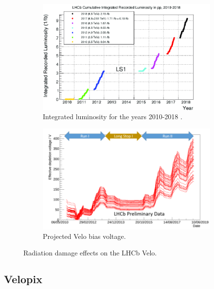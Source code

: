 \begin{figure}[H]
  \centering
\begin{subfigure}[t]{0.49\textwidth}
  \centering
  \includegraphics[width=\linewidth]{figures/chapter2/LHCb-Cumulative-Integrated-Recorded-Luminosity-in-pp-2010-2018.png}
  \caption{Integrated luminosity for the years 2010-2018 \cite{Kurbatov}.}
  \label{fig:velo_lumi}
  \end{subfigure}
\begin{subfigure}[t]{0.49\textwidth}
  \centering
  \includegraphics[width=\linewidth]{figures/chapter2/velo_strip_voltage.png}
  \caption[stripvo]{Projected Velo bias voltage.}
  \label{fig:velo_voltage}
  \end{subfigure}
  \caption[]{Radiation damage effects on the LHCb Velo.}
  \label{fig:radiation_damage}
\end{figure}


\subsection{Velopix}

